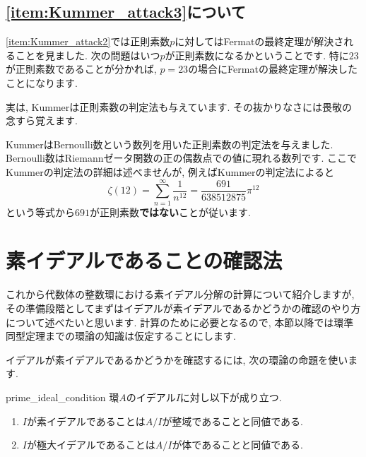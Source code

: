 \documentclass[11pt,b5paper,oneside,titlepage,lualatex]{ltjsreport}
\begin{document}

\subsection{\ref{item:Kummer_attack3}について}


\ref{item:Kummer_attack2}では正則素数$ p $に対してはFermatの最終定理が解決されることを見ました. 
次の問題はいつ$ p $が正則素数になるかということです. 
特に$ 23 $が正則素数であることが分かれば, $ p=23 $の場合にFermatの最終定理が解決したことになります. 

実は, Kummerは正則素数の判定法も与えています. 
その抜かりなさには畏敬の念すら覚えます. 

KummerはBernoulli数という数列を用いた正則素数の判定法を与えました. 
Bernoulli数はRiemannゼータ関数の正の偶数点での値に現れる数列です. 
ここでKummerの判定法の詳細は述べませんが, 例えばKummerの判定法によると
\[
\zeta(12) = \sum_{n=1}^{\infty} \frac{1}{n^{12}} = \frac{691}{638512875} \pi^{12}
\]
という等式から$ 691 $が正則素数\textbf{ではない}ことが従います. 


\section{素イデアルであることの確認法} \label{sec:素イデアルであることの確認法}


これから代数体の整数環における素イデアル分解の計算について紹介しますが, その準備段階としてまずはイデアルが素イデアルであるかどうかの確認のやり方について述べたいと思います. 
計算のために必要となるので, 本節以降では環準同型定理までの環論の知識は仮定することにします. 

イデアルが素イデアルであるかどうかを確認するには, 次の環論の命題を使います. 

\begin{prop}{}{prime_ideal_condition}
	環$ A $のイデアル$ I $に対し以下が成り立つ. 
	\begin{enumerate}
		\item $ I $が素イデアルであることは$ A/I $が整域であることと同値である. 
		\item $ I $が極大イデアルであることは$ A/I $が体であることと同値である. 
	\end{enumerate}
\end{prop}
\end{document}
